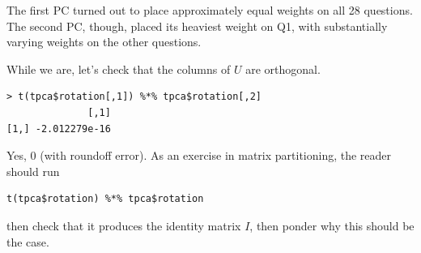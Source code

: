 The first PC turned out to place approximately equal weights on all 28
questions.  The second PC, though, placed its heaviest weight on Q1,
with substantially varying weights on the other questions.

While we are, let's check that the columns of $U$ are orthogonal.

\begin{lstlisting}
> t(tpca$rotation[,1]) %*% tpca$rotation[,2]
              [,1]
[1,] -2.012279e-16
\end{lstlisting}

Yes, 0 (with roundoff error).  As an exercise in matrix partitioning,
the reader should run

\begin{lstlisting}
t(tpca$rotation) %*% tpca$rotation
\end{lstlisting}

then check that it produces the identity matrix $I$, then ponder why
this should be the case.
